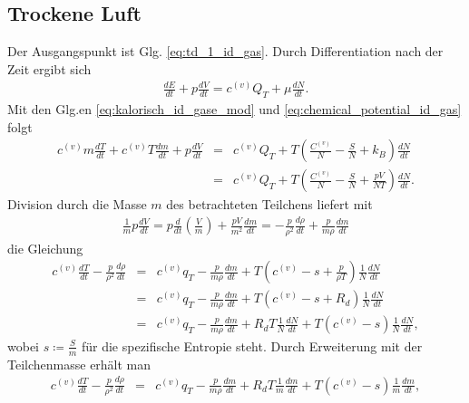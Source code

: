 \documentclass{book}
\begin{document}
\subsection{Trockene Luft}
\label{sec:trockene_luft}

Der Ausgangspunkt ist Glg. \eqref{eq:td_1_id_gas}. Durch Differentiation nach der Zeit ergibt sich
%
\begin{eqnarray}
\frac{dE}{dt} + p\frac{dV}{dt} = c^{(v)}Q_T + \mu\frac{dN}{dt}.
\end{eqnarray}
%
Mit den Glg.en \eqref{eq:kalorisch_id_gase_mod} und \eqref{eq:chemical_potential_id_gas} folgt
%
\begin{eqnarray}
c^{(v)}m\frac{dT}{dt} + c^{(v)}T\frac{dm}{dt} + p\frac{dV}{dt} & = & c^{(v)}Q_T + T\left(\frac{C^{(v)}}{N} - \frac{S}{N} + k_B\right)\frac{dN}{dt}\nonumber\\
& = & c^{(v)}Q_T + T\left(\frac{C^{(v)}}{N} - \frac{S}{N} + \frac{pV}{NT}\right)\frac{dN}{dt}.
\end{eqnarray}
%
Division durch die Masse $m$ des betrachteten Teilchens liefert mit
%
\begin{eqnarray}
\frac{1}{m}p\frac{dV}{dt} = p\frac{d}{dt}\left(\frac{V}{m}\right) + \frac{pV}{m^2}\frac{dm}{dt} = -\frac{p}{\rho^2}\frac{d\rho}{dt} + \frac{p}{m\rho}\frac{dm}{dt}
\end{eqnarray}
%
die Gleichung
%
\begin{eqnarray}
c^{(v)}\frac{dT}{dt} - \frac{p}{\rho^2}\frac{d\rho}{dt} & = & c^{(v)}q_T - \frac{p}{m\rho}\frac{dm}{dt} + T\left(c^{(v)} - s + \frac{p}{\rho T}\right)\frac{1}{N}\frac{dN}{dt}\nonumber\\
& = & c^{(v)}q_T - \frac{p}{m\rho}\frac{dm}{dt} + T\left(c^{(v)} - s + R_d\right)\frac{1}{N}\frac{dN}{dt}\nonumber\\
& = & c^{(v)}q_T - \frac{p}{m\rho}\frac{dm}{dt} + R_dT\frac{1}{N}\frac{dN}{dt} + T\left(c^{(v)} - s\right)\frac{1}{N}\frac{dN}{dt},
\end{eqnarray}
%
wobei $s \coloneqq \frac{S}{m}$ für die spezifische Entropie steht. Durch Erweiterung mit der Teilchenmasse erhält man
%
\begin{eqnarray}
c^{(v)}\frac{dT}{dt} - \frac{p}{\rho^2}\frac{d\rho}{dt} & = & c^{(v)}q_T - \frac{p}{m\rho}\frac{dm}{dt} + R_dT\frac{1}{m}\frac{dm}{dt} + T\left(c^{(v)} - s\right)\frac{1}{m}\frac{dm}{dt},
\end{eqnarray}
\end{document}
